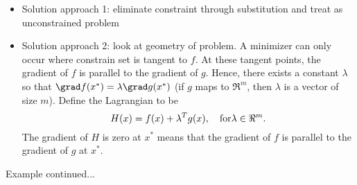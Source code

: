 \begin{itemize}
\item Solution approach 1: eliminate constraint through substitution and treat as unconstrained problem
\newpage
\item Solution approach 2: look at geometry of problem.  A minimizer can only occur where constrain set is tangent to $f$. At these tangent points, the gradient of $f$ is parallel to the gradient of $g$. Hence, there exists a constant $\lambda$ so that $\grad f(x^*) = \lambda \grad g(x^*)$ (if $g$ maps to $\Re^m$, then $\lambda$ is a vector of size $m$). Define the Lagrangian to be $$H(x) = f(x) + \lambda^Tg(x), \quad {\rm for} \lambda \in \Re^m.$$  The gradient of $H$ is zero at $x^*$ means that the gradient of $f$ is parallel to the gradient of $g$ at $x^*$. 
\end{itemize}
Example continued...
\newpage
